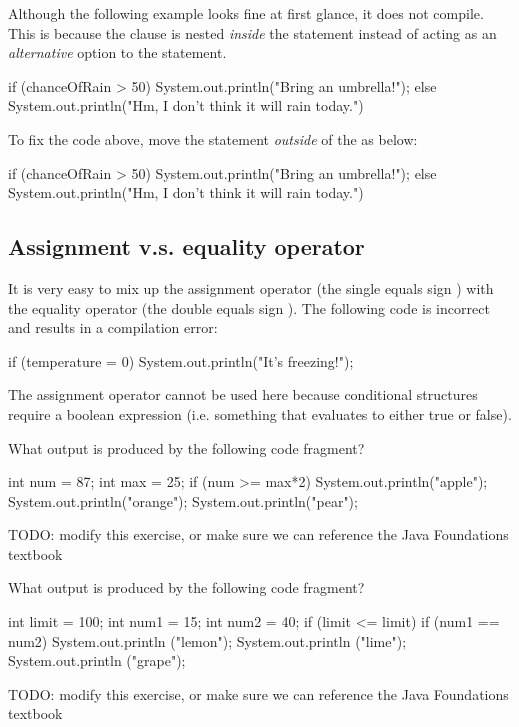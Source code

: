 Although the following example looks fine at first glance, it does not compile. This is because the  clause is nested \emph{inside} the  statement instead of acting as an \emph{alternative} option to the  statement.

\begin{code}
if (chanceOfRain > 50) {
    System.out.println("Bring an umbrella!");
    else {
        System.out.println("Hm, I don't think it will rain today.")
    }
}
\end{code}

\noindent To fix the code above, move the  statement \emph{outside} of the  as below:

\begin{code}
if (chanceOfRain > 50) {
    System.out.println("Bring an umbrella!");
} else {
    System.out.println("Hm, I don't think it will rain today.")
}
\end{code}

\subsection{Assignment v.s. equality operator}
It is very easy to mix up the assignment operator (the single equals sign \ic{=}) with the equality operator (the double equals sign \ic{==}). The following code is incorrect and results in a compilation error:

\begin{code}
if (temperature = 0) {
    System.out.println("It's freezing!");
}
\end{code}

\noindent The assignment operator cannot be used here because conditional structures require a boolean expression (i.e. something that evaluates to either true or false). 

\exercisesection

\begin{exercise}
What output is produced by the following code fragment?

\begin{code}
int num = 87;
int max = 25;
if (num >= max*2)
    System.out.println("apple");
    System.out.println("orange");
System.out.println("pear");
\end{code}

TODO: modify this exercise, or make sure we can reference the Java Foundations textbook
\end{exercise}

\begin{exercise}
What output is produced by the following code fragment?

\begin{code}
int limit = 100;
int num1 = 15;
int num2 = 40;
if (limit <= limit) {
    if (num1 == num2)
        System.out.println ("lemon");
    System.out.println ("lime");
}
System.out.println ("grape");
\end{code}

TODO: modify this exercise, or make sure we can reference the Java Foundations textbook
\end{exercise}


